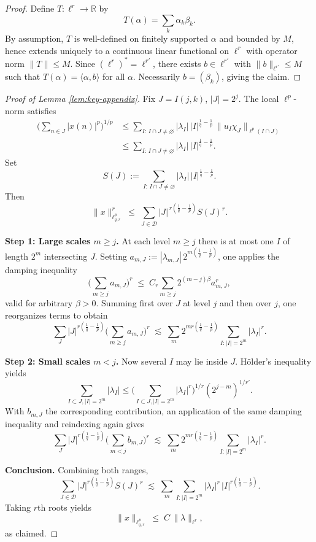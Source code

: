 \documentclass[preprint,12pt]{elsarticle}
\begin{document}
\begin{proof}
Define $T:\ell^r\to \mathbb{R}$ by 
\[
  T(\alpha) = \sum_k \alpha_k \beta_k .
\]
By assumption, $T$ is well-defined on finitely supported $\alpha$ and bounded by $M$, hence extends uniquely to a continuous linear functional on $\ell^r$ with operator norm $\|T\|\le M$.  
Since $(\ell^r)^* = \ell^{r'}$, there exists $b\in \ell^{r'}$ with $\|b\|_{\ell^{r'}}\le M$ such that $T(\alpha)=\langle \alpha,b\rangle$ for all $\alpha$. Necessarily $b=(\beta_k)$, giving the claim.
\end{proof}

\begin{proof}[Proof of Lemma \ref{lem:key-appendix}]
Fix $J=I(j,k)$, $|J|=2^{j}$. The local $\ell^{p}$-norm satisfies
\begin{align*}
\Big(\sum_{n\in J}|x(n)|^{p}\Big)^{1/p}
&\le \sum_{I:\,I\cap J\neq\varnothing} |\lambda_I|\,|I|^{\frac{1}{q}-\frac{1}{p}} \,\|u_I\chi_J\|_{\ell^{p}(I\cap J)} \\
&\le \sum_{I:\,I\cap J\neq\varnothing} |\lambda_I|\,|I|^{\frac{1}{q}-\frac{1}{p}} .
\end{align*}
Set
\[
S(J):=\sum_{I:\,I\cap J\neq\varnothing} |\lambda_I|\,|I|^{\frac{1}{q}-\frac{1}{p}}.
\]
Then
\[
\|x\|_{\ell^{p}_{q,r}}^{r}
\;\le\; \sum_{J\in\mathcal D} |J|^{\,r(\frac{1}{q}-\frac{1}{p})} S(J)^{r}.
\]

\medskip
\noindent\textbf{Step 1: Large scales $m\ge j$.}  
At each level $m\ge j$ there is at most one $I$ of length $2^m$ intersecting $J$. 
Setting $a_{m,J}:=|\lambda_{m,J}|\,2^{m(\frac{1}{q}-\frac{1}{p})}$, one applies the damping inequality
\[
\Big(\sum_{m\ge j} a_{m,J}\Big)^{r} \;\le\; C_r \sum_{m\ge j} 2^{(m-j)\beta} a_{m,J}^{r},
\]
valid for arbitrary $\beta>0$. Summing first over $J$ at level $j$ and then over $j$, one reorganizes terms to obtain
\[
\sum_{J} |J|^{r(\frac{1}{q}-\frac{1}{p})}\Big(\sum_{m\ge j} a_{m,J}\Big)^{r}
\;\lesssim\; \sum_{m} 2^{m r(\frac{1}{q}-\frac{1}{p})}\!\!\sum_{I:|I|=2^{m}}|\lambda_I|^{r}.
\]

\medskip
\noindent\textbf{Step 2: Small scales $m<j$.}  
Now several $I$ may lie inside $J$. Hölder’s inequality yields
\[
\sum_{I\subset J,|I|=2^m}|\lambda_I|
\le \Big(\sum_{I\subset J,|I|=2^m}|\lambda_I|^{r}\Big)^{1/r}(2^{j-m})^{1/r'}.
\]
With $b_{m,J}$ the corresponding contribution, an application of the same damping inequality and reindexing again gives
\[
\sum_{J} |J|^{r(\frac{1}{q}-\frac{1}{p})}\Big(\sum_{m<j} b_{m,J}\Big)^{r}
\;\lesssim\; \sum_{m} 2^{m r(\frac{1}{q}-\frac{1}{p})}\!\!\sum_{I:|I|=2^{m}}|\lambda_I|^{r}.
\]

\medskip
\noindent\textbf{Conclusion.}  
Combining both ranges,
\[
\sum_{J\in\mathcal D} |J|^{r(\tfrac{1}{q}-\tfrac{1}{p})} S(J)^{r}
\;\lesssim\; \sum_{m}\sum_{I:|I|=2^{m}} |\lambda_I|^{r}\,|I|^{r(\tfrac{1}{q}-\tfrac{1}{p})}.
\]
Taking $r$th roots yields
\[
\|x\|_{\ell^{p}_{q,r}} \;\le\; C\,\|\lambda\|_{\ell^r},
\]
as claimed.
\end{proof}
\end{document}
